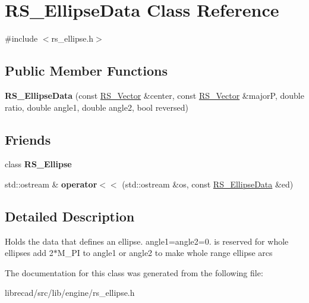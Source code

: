 \hypertarget{classRS__EllipseData}{\section{R\-S\-\_\-\-Ellipse\-Data Class Reference}
\label{classRS__EllipseData}
}


{\ttfamily \#include $<$rs\-\_\-ellipse.\-h$>$}

\subsection*{Public Member Functions}
\begin{DoxyCompactItemize}
\item 
\hypertarget{classRS__EllipseData_a5b467a1f3028fa5dd9511b7c558247fa}{{\bfseries R\-S\-\_\-\-Ellipse\-Data} (const \hyperlink{classRS__Vector}{R\-S\-\_\-\-Vector} \&center, const \hyperlink{classRS__Vector}{R\-S\-\_\-\-Vector} \&major\-P, double ratio, double angle1, double angle2, bool reversed)}\label{classRS__EllipseData_a5b467a1f3028fa5dd9511b7c558247fa}

\end{DoxyCompactItemize}
\subsection*{Friends}
\begin{DoxyCompactItemize}
\item 
\hypertarget{classRS__EllipseData_aba124a716984f68e69b1cb0089441367}{class {\bfseries R\-S\-\_\-\-Ellipse}}\label{classRS__EllipseData_aba124a716984f68e69b1cb0089441367}

\item 
\hypertarget{classRS__EllipseData_ae78e2ae45605cedae6d31a38075bcda9}{std\-::ostream \& {\bfseries operator$<$$<$} (std\-::ostream \&os, const \hyperlink{classRS__EllipseData}{R\-S\-\_\-\-Ellipse\-Data} \&ed)}\label{classRS__EllipseData_ae78e2ae45605cedae6d31a38075bcda9}

\end{DoxyCompactItemize}


\subsection{Detailed Description}
Holds the data that defines an ellipse. angle1=angle2=0. is reserved for whole ellipses add 2$\ast$\-M\-\_\-\-P\-I to angle1 or angle2 to make whole range ellipse arcs 

The documentation for this class was generated from the following file\-:\begin{DoxyCompactItemize}
\item 
librecad/src/lib/engine/rs\-\_\-ellipse.\-h\end{DoxyCompactItemize}
